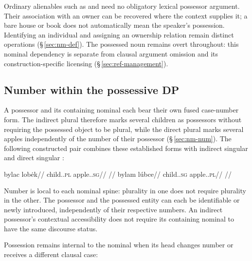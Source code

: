 Ordinary alienables such as   and 
 need no obligatory lexical possessor argument. Their association
with an owner can be recovered where the context supplies it; a bare house
or book does not automatically mean the speaker's possession. Identifying
an individual and assigning an ownership relation remain distinct operations
(§\,\ref{sec:nm-def}). The possessed noun remains overt throughout:
this nominal dependency is separate from clausal argument omission and its
construction-specific licensing (§\,\ref{sec:ref-management}).

\subsection{Number within the possessive DP}
\label{sec:nm-poss-ne}
\label{sec:nm-poss-number}

A possessor and its containing nominal each bear their own fused case-number
form. The indirect plural  therefore marks several children as
possessors without requiring the possessed object to be plural, while the
direct plural  marks several apples independently of the number
of their possessor (§\,\ref{sec:nm-num}). The following constructed pair
combines these established forms with indirect singular  and
direct singular :

\pex
\a
\begingl
\gla bylac lobėk//
\glb child.\Ind{}.\textsc{pl} apple.\Dir{}.\textsc{sg}//
\glft {}//
\endgl
\a
\begingl
\gla bylam lúbce//
\glb child.\Ind{}.\textsc{sg} apple.\Dir{}.\textsc{pl}//
\glft {}//
\endgl
\xe

\noindent Number is local to each nominal spine: plurality in one does
not require plurality in the other. The possessor and the possessed entity
can each be identifiable or newly introduced, independently of their
respective numbers. An indirect possessor's contextual accessibility does
not require its containing nominal to have the same discourse status.

Possession remains internal to the nominal when its head changes number
or receives a different clausal case:

